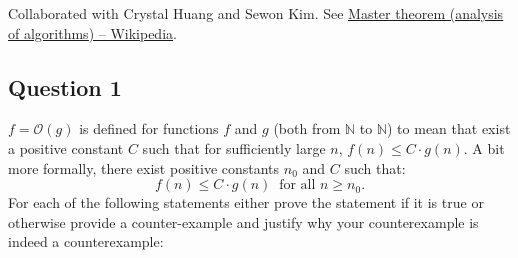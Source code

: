 \def\lc{\left\lceil}   
\def\rc{\right\rceil}
\runningheadrule
\firstpageheadrule
\cfoot{}
Collaborated with Crystal Huang and Sewon Kim. See \href{https://en.wikipedia.org/wiki/Master_theorem_(analysis_of_algorithms)}{Master theorem (analysis of algorithms) -- Wikipedia}.
\subsection*{Question 1}
$f=\mathcal{O}(g)$ is defined for functions $f$ and $g$ (both from $\mathbb{N}$ to $\mathbb{N}$) to mean that exist a positive constant $C$ such that for sufficiently large $n$, $f(n)\leq C\cdot g(n)$. A bit more formally, there exist positive constants $n_0$ and $C$ such that:
$$f(n)\leq C\cdot g(n) \ \text{ for all } n\geq n_0.$$
For each of the following statements either prove the statement if it is true or otherwise provide a counter-example and justify why your counterexample is indeed a counterexample:
